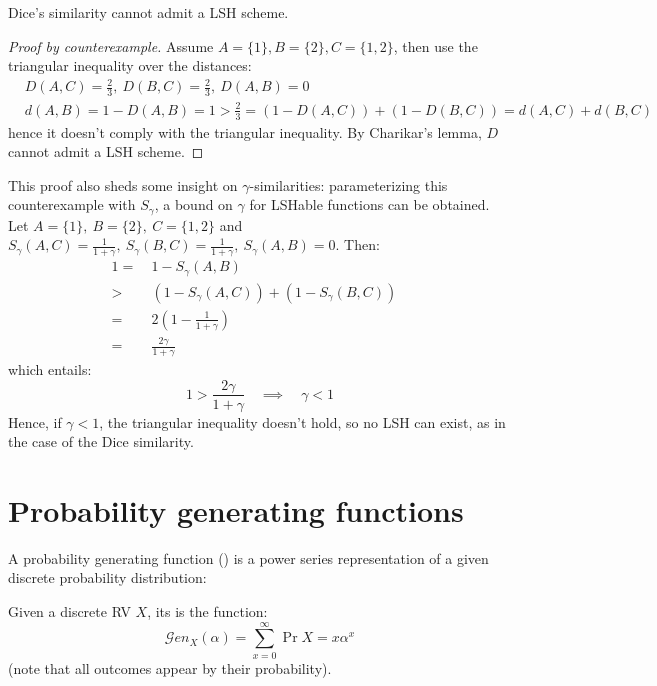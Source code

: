 \begin{cor}
	Dice's similarity cannot admit a LSH scheme.
\end{cor}

\begin{proof}[Proof by counterexample]
	Assume $A = \{1\}, B = \{2\}, C = \{1, 2\}$, then use the triangular inequality over the distances:
	\begin{align*}
		& D(A, C) = \frac{2}{3},\ D(B, C) = \frac{2}{3},\ D(A, B) = 0 \\
		& d(A, B) = 1 - D(A, B) = 1 > \frac{2}{3} = (1 - D(A, C)) + (1 - D(B, C)) = d(A, C) + d(B, C)
	\end{align*}
	hence it doesn't comply with the triangular inequality. By Charikar's lemma, $D$ cannot admit a LSH scheme.
\end{proof}

This proof also sheds some insight on $\gamma$-similarities: parameterizing this counterexample with $S_\gamma$, a bound on $\gamma$ for LSHable functions can be obtained. Let $A = \{1\},\ B = \{2\},\ C = \{1, 2\}$ and $S_\gamma(A, C) = \frac{1}{1 + \gamma},\ S_\gamma(B, C) = \frac{1}{1 + \gamma},\ S_\gamma(A, B) = 0$. Then:
\begin{align*}
	1 =&\ 1 - S_\gamma(A, B) 							& \tag{$S_\gamma(A, B) = 0$}\\
	  >&\ (1 - S_\gamma(A, C)) + (1 - S_\gamma(B, C)) 	& \tag{trineq on $1 - S_\gamma$, which is a metric by Charikar's lemma}\\
	  =&\ 2 \left( 1 - \frac{1}{1 + \gamma} \right)		& \\
	  =&\ \frac{2\gamma}{1 + \gamma} 					&
\end{align*}
which entails:
\[
	1 > \frac{2\gamma}{1 + \gamma} \quad \implies \quad \gamma < 1
\]
Hence, if $\gamma < 1$, the triangular inequality doesn't hold, so no LSH can exist, as in the case of the Dice similarity.

	
\section{Probability generating functions}
	
A probability generating function (\pgf) is a power series representation of a given discrete probability distribution:

\begin{defn}
	Given a discrete RV $X$, its \pgf{} is the function:
	\[
		\mathcal{G}en_X(\alpha) = \sum_{x = 0}^{\infty} \Pr{X = x} \alpha^x
	\]
	(note that all outcomes appear by their probability).
\end{defn}


